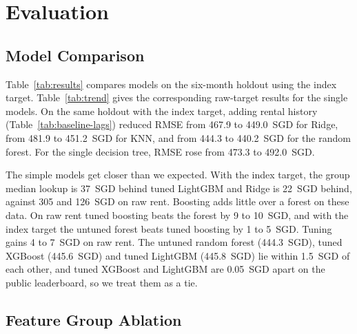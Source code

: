 \section{Evaluation}\label{sec:evaluation}

\subsection{Model Comparison}

Table~\ref{tab:results} compares models on the six-month holdout using the index target. Table~\ref{tab:trend} gives the corresponding raw-target results for the single models. On the same holdout with the index target, adding rental history (Table~\ref{tab:baseline-lags}) reduced RMSE from 467.9 to 449.0~SGD for Ridge, from 481.9 to 451.2~SGD for KNN, and from 444.3 to 440.2~SGD for the random forest. For the single decision tree, RMSE rose from 473.3 to 492.0~SGD.

\begin{table}[htbp]
\caption{Time holdout results with G0+G1 features and the index target, best first. The blend additionally uses the lag features. RMSE, MAE and bias are in SGD, MAPE in percent and fit time in seconds.}
\label{tab:results}
\centering
\footnotesize

\end{table}

The simple models get closer than we expected. With the index target, the group median lookup is 37~SGD behind tuned LightGBM and Ridge is 22~SGD behind, against 305 and 126~SGD on raw rent. Boosting adds little over a forest on these data. On raw rent tuned boosting beats the forest by 9 to 10~SGD, and with the index target the untuned forest beats tuned boosting by 1 to 5~SGD. Tuning gains 4 to 7~SGD on raw rent. The untuned random forest (444.3~SGD), tuned XGBoost (445.6~SGD) and tuned LightGBM (445.8~SGD) lie within 1.5~SGD of each other, and tuned XGBoost and LightGBM are 0.05~SGD apart on the public leaderboard, so we treat them as a tie.

\subsection{Feature Group Ablation}

